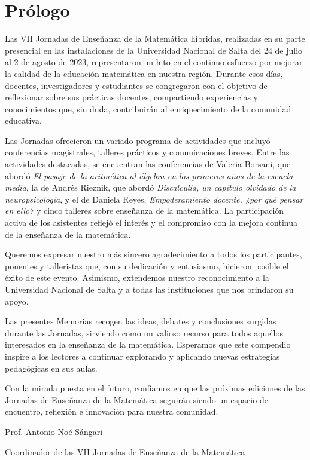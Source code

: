 \section*{\centering \sffamily Prólogo}

Las VII Jornadas de Enseñanza de la Matemática híbridas, realizadas en su parte presencial en las instalaciones de la Universidad Nacional de Salta del 24 de julio al 2 de agosto de 2023, representaron un hito en el continuo esfuerzo por mejorar la calidad de la educación matemática en nuestra región. Durante esos días, docentes, investigadores y estudiantes se congregaron con el objetivo de reflexionar sobre sus prácticas docentes, compartiendo experiencias y conocimientos que, sin duda, contribuirán al enriquecimiento de la comunidad educativa.

Las Jornadas ofrecieron un variado programa de actividades que incluyó conferencias magistrales, talleres prácticos y comunicaciones breves. Entre las actividades destacadas, se encuentran las conferencias de Valeria Borsani, que abordó \emph{El pasaje de la aritmética al álgebra en los primeros años de la escuela media}, la de Andrés Rieznik, que abordó \emph{Discalculia, un capítulo olvidado de la neuropsicología}, y el de Daniela Reyes, \emph{Empoderamiento docente, ¿por qué pensar en ello?} y cinco talleres sobre enseñanza de la matemática. La participación activa de los asistentes reflejó el interés y el compromiso con la mejora continua de la enseñanza de la matemática.

Queremos expresar nuestro más sincero agradecimiento a todos los participantes, ponentes y talleristas que, con su dedicación y entusiasmo, hicieron posible el éxito de este evento. Asimismo, extendemos nuestro reconocimiento a la Universidad Nacional de Salta y a todas las instituciones que nos brindaron su apoyo.

Las presentes Memorias recogen las ideas, debates y conclusiones surgidas durante las Jornadas, sirviendo como un valioso recurso para todos aquellos interesados en la enseñanza de la matemática. Esperamos que este compendio inspire a los lectores a continuar explorando y aplicando nuevas estrategias pedagógicas en sus aulas.

Con la mirada puesta en el futuro, confiamos en que las próximas ediciones de las Jornadas de Enseñanza de la Matemática seguirán siendo un espacio de encuentro, reflexión e innovación para nuestra comunidad.

\vspace{5cm}

\begin{center}
	\large Prof. Antonio Noé Sángari
	
	\normalfont Coordinador de las VII Jornadas de Enseñanza de la Matemática
\end{center}